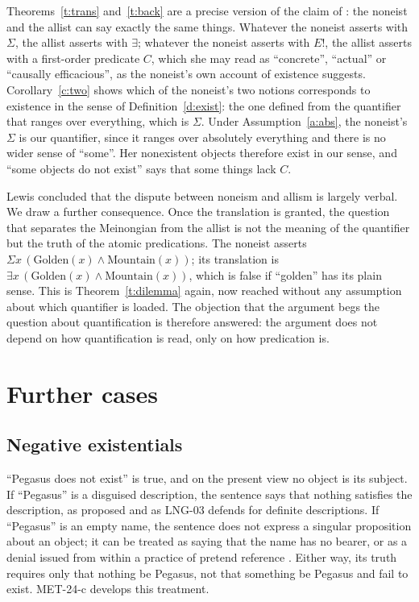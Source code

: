 \documentclass{situationist-preprint}
\begin{document}
Theorems~\ref{t:trans} and~\ref{t:back} are a precise version of the claim of \citet{Lewis1990}: the noneist and the allist can say exactly the same things. Whatever the noneist asserts with $\Sigma$, the allist asserts with $\exists$; whatever the noneist asserts with $E!$, the allist asserts with a first-order predicate $C$, which she may read as \enquote{concrete}, \enquote{actual} or \enquote{causally efficacious}, as the noneist's own account of existence suggests. Corollary~\ref{c:two} shows which of the noneist's two notions corresponds to existence in the sense of Definition~\ref{d:exist}: the one defined from the quantifier that ranges over everything, which is $\Sigma$. Under Assumption~\ref{a:abs}, the noneist's $\Sigma$ is our quantifier, since it ranges over absolutely everything and there is no wider sense of \enquote{some}. Her nonexistent objects therefore exist in our sense, and \enquote{some objects do not exist} says that some things lack $C$.

Lewis concluded that the dispute between noneism and allism is largely verbal. We draw a further consequence. Once the translation is granted, the question that separates the Meinongian from the allist is not the meaning of the quantifier but the truth of the atomic predications. The noneist asserts $\Sigma x\, (\mathrm{Golden}(x) \wedge \mathrm{Mountain}(x))$; its translation is $\exists x\, (\mathrm{Golden}(x) \wedge \mathrm{Mountain}(x))$, which is false if \enquote{golden} has its plain sense. This is Theorem~\ref{t:dilemma} again, now reached without any assumption about which quantifier is loaded. The objection that the argument begs the question about quantification is therefore answered: the argument does not depend on how quantification is read, only on how predication is.

\section{Further cases}\label{s:cases}

\subsection{Negative existentials}

\enquote{Pegasus does not exist} is true, and on the present view no object is its subject. If \enquote{Pegasus} is a disguised description, the sentence says that nothing satisfies the description, as \citet{Russell1905} proposed and as LNG-03 defends for definite descriptions. If \enquote{Pegasus} is an empty name, the sentence does not express a singular proposition about an object; it can be treated as saying that the name has no bearer, or as a denial issued from within a practice of pretend reference \citep{Evans1982,Kripke2013}. Either way, its truth requires only that nothing be Pegasus, not that something be Pegasus and fail to exist. MET-24-c develops this treatment.
\end{document}
